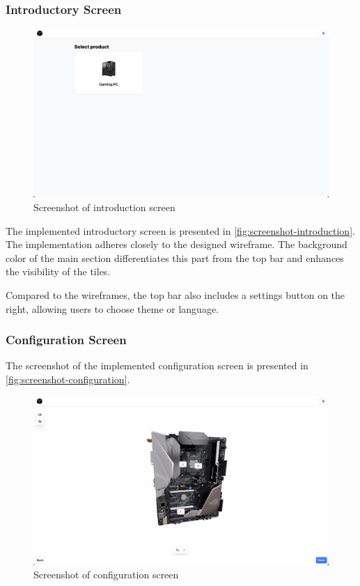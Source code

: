 \subsubsection{Introductory Screen}

\begin{figure}[h]
\centering
\includegraphics[width=\textwidth]{images/screenshot_introduction.png}
\caption{Screenshot of introduction screen}
\label{fig:screenshot-introduction}
\end{figure}

The implemented introductory screen is presented in \autoref{fig:screenshot-introduction}. The implementation adheres closely to the designed wireframe. The background color of the main section differentiates this part from the top bar and enhances the visibility of the tiles.

Compared to the wireframes, the top bar also includes a settings button on the right, allowing users to choose theme or language.


\subsubsection{Configuration Screen}

The screenshot of the implemented configuration screen is presented in \autoref{fig:screenshot-configuration}.

\begin{figure}[h]
\centering
\includegraphics[width=\textwidth]{images/screenshot_configuration.png}
\caption{Screenshot of configuration screen}
\label{fig:screenshot-configuration}
\end{figure}

